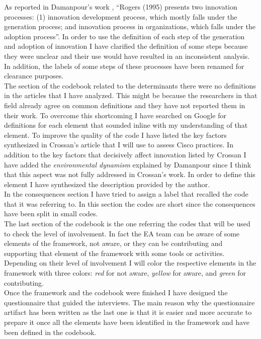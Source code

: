As reported in Damanpour's work \citep{damanpour2006}, ``Rogers (1995) presents two innovation processes: (1) innovation development process, which mostly falls under the generation process; and innovation process in organizations, which falls under the adoption process''.
In order to use the definition of each step of the generation and adoption of innovation I have clarified the definition of some steps because they were unclear and their use would have resulted in an inconsistent analysis. In addition, the labels of some steps of these processes have been renamed for clearance purposes.
\\ %
The section of the codebook related to the determinants there were no definitions in the articles that I have analyzed. This might be because the researchers in that field already agree on common definitions and they have not reported them in their work.
To overcome this shortcoming I have searched on Google for definitions for each element that sounded inline with my understanding of that element. To improve the quality of the code I have listed the key factors synthesized in Crossan's article \citep{crossan2010} that I will use to assess Cisco practices.
In addition to the key factors that decisively affect innovation listed by Crossan I have added the \textit{environmental dynamism} explained by Damanpour \citep{damanpour1998} since I think that this aspect was not fully addressed in Crossan's work. In order to define this element I have synthesized the description provided by the author.
\\ %
In the consequences section I have tried to assign a label that recalled the code that it was referring to. In this section the codes are short since the consequences have been split in small codes.
\\ %
The last section of the codebook is the one referring the codes that will be used to check the level of involvement. In fact the EA team can be aware of some elements of the framework, not aware, or they can be contributing and supporting that element of the framework with some tools or activities. Depending on their level of involvement I will color the respective elements in the framework with three colors: \textit{red} for not aware, \textit{yellow} for aware, and \textit{green} for contributing.
\\
Once the framework and the codebook were finished I have designed the questionnaire that guided the interviews. The main reason why the questionnaire artifact has been written as the last one is that it is easier and more accurate to prepare it once all the elements have been identified in the framework and have been defined in the codebook.

